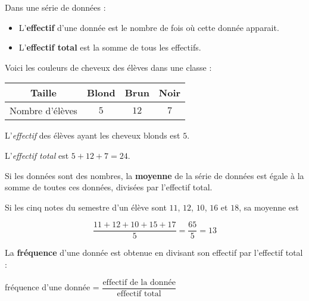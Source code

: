 \documentclass[../€Cours-complet/Cours-complet]{subfiles}
\begin{document}
\maketitleCours

\begin{cours}[Effectif]
	Dans une série de données :
	\begin{itemize}
		\item L'\textbf{effectif} d'une donnée est le nombre de fois où cette donnée apparait.
		\item L'\textbf{effectif total} est la somme de tous les effectifs.
	\end{itemize}
\end{cours}

\begin{exemple}
	Voici les couleurs de cheveux des élèves dans une classe :

	\begin{center}
		\begin{tabular}{|c|c|c|c|}
			\hline
			Taille          & Blond & Brun & Noir
			\\ \hline
			Nombre d'élèves & $5$   & $12$ & $7$
			\\ \hline
		\end{tabular}
	\end{center}

	L'\textit{effectif} des élèves ayant les cheveux blonds est $5$.

	L'\textit{effectif total} est $5 + 12 + 7 = 24$.
\end{exemple}

\begin{cours}[Moyenne]
	Si les données sont des nombres, la \textbf{moyenne} de la série de données est égale à la somme de toutes ces données, divisées par l'effectif total.
\end{cours}

\begin{exemple}
	Si les cinq notes du semestre d'un élève sont $11$, $12$, $10$, $16$ et $18$, sa moyenne est

	$$ \dfrac{11 + 12 + 10 + 15 + 17}{5} = \dfrac{65}{5} = 13 $$
\end{exemple}

\begin{cours}[Fréquence]
	La \textbf{fréquence} d'une donnée est obtenue en divisant son effectif par l'effectif total :
	\begin{center}
		fréquence d'une donnée = $\dfrac{\text{effectif de la donnée}}{\text{effectif total}}$
	\end{center}
\end{cours}
\end{document}
